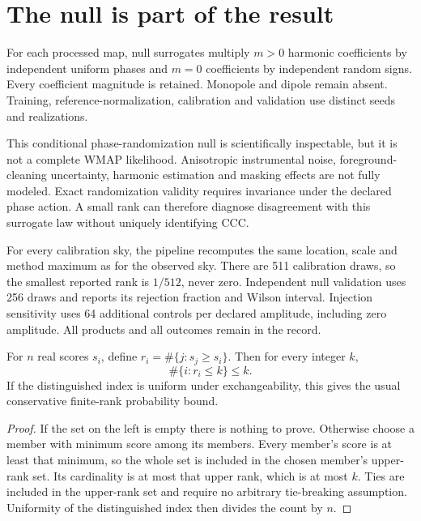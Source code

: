 \section{The null is part of the result}

For each processed map, null surrogates multiply $m>0$ harmonic coefficients by independent uniform phases and $m=0$ coefficients by independent random signs. Every coefficient magnitude is retained. Monopole and dipole remain absent. Training, reference-normalization, calibration and validation use distinct seeds and realizations.

This conditional phase-randomization null is scientifically inspectable, but it is not a complete WMAP likelihood. Anisotropic instrumental noise, foreground-cleaning uncertainty, harmonic estimation and masking effects are not fully modeled. Exact randomization validity requires invariance under the declared phase action. A small rank can therefore diagnose disagreement with this surrogate law without uniquely identifying CCC.

For every calibration sky, the pipeline recomputes the same location, scale and method maximum as for the observed sky. There are 511 calibration draws, so the smallest reported rank is $1/512$, never zero. Independent null validation uses 256 draws and reports its rejection fraction and Wilson interval. Injection sensitivity uses 64 additional controls per declared amplitude, including zero amplitude. All products and all outcomes remain in the record.

\begin{theorem}
For $n$ real scores $s_i$, define $r_i=\#\{j:s_j\ge s_i\}$. Then for every integer $k$,
\[
 \#\{i:r_i\le k\}\le k.
\]
If the distinguished index is uniform under exchangeability, this gives the usual conservative finite-rank probability bound.
\end{theorem}
\begin{proof}
If the set on the left is empty there is nothing to prove. Otherwise choose a member with minimum score among its members. Every member's score is at least that minimum, so the whole set is included in the chosen member's upper-rank set. Its cardinality is at most that upper rank, which is at most $k$. Ties are included in the upper-rank set and require no arbitrary tie-breaking assumption. Uniformity of the distinguished index then divides the count by $n$.
\end{proof}

